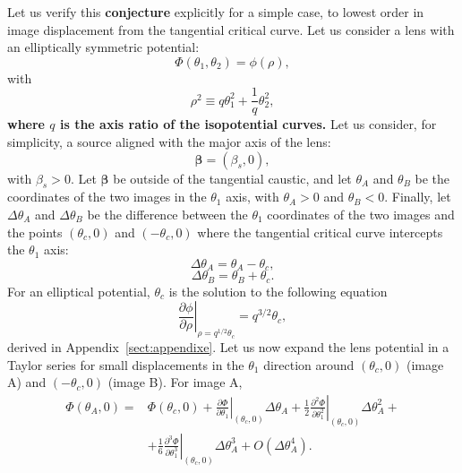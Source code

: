 \documentclass[usenatbib]{mnras}
\begin{document}
Let us verify this {\bf conjecture} explicitly for a simple case, to lowest order in image displacement from the tangential critical curve.
Let us consider a lens with an elliptically symmetric potential:
\begin{equation}\label{eq:potell}
\Phi(\theta_1, \theta_2) = \phi(\rho),
\end{equation} 
with
\begin{equation}
\rho^2 \equiv q\theta_1^2 + \frac1q\theta_2^2,
\end{equation}
{\bf where $q$ is the axis ratio of the isopotential curves.}
Let us consider, for simplicity, a source aligned with the major axis of the lens:
\begin{equation}
\boldsymbol\beta = (\beta_s, 0),
\end{equation}
with $\beta_s > 0$.
Let $\boldsymbol\beta$ be outside of the tangential caustic, and let $\theta_A$ and $\theta_B$ be the coordinates of the two images in the $\theta_1$ axis, with $\theta_A > 0$ and $\theta_B < 0$.
Finally, let $\Delta\theta_A$ and $\Delta\theta_B$ be the difference between the $\theta_1$ coordinates of the two images and the points $(\theta_c,0)$ and $(-\theta_c,0)$ where the tangential critical curve intercepts the $\theta_1$ axis:
\begin{equation}
\Delta\theta_A = \theta_A - \theta_c,
\end{equation}
\begin{equation}
\Delta\theta_B = \theta_B + \theta_c.
\end{equation}
For an elliptical potential, $\theta_c$ is the solution to the following equation
\begin{equation}\label{eq:critell}
\left.\frac{\partial\phi}{\partial\rho}\right\rvert_{\rho=q^{1/2}\theta_c} = q^{3/2}\theta_c,
\end{equation}
derived in Appendix~\ref{sect:appendixe}.
Let us now expand the lens potential in a Taylor series for small displacements in the $\theta_1$ direction around $(\theta_c, 0)$ (image A) and $(-\theta_c, 0)$ (image B).
For image A,
\begin{align}
\Phi(\theta_A, 0) = &\Phi(\theta_c, 0) + \left.\frac{\partial\Phi}{\partial\theta_1}\right\rvert_{(\theta_c,0)}\Delta\theta_A + \frac12\left.\frac{\partial^2\Phi}{\partial\theta_1^2}\right\rvert_{(\theta_c,0)}\Delta\theta_A^2 + \nonumber \\
& + \frac16\left.\frac{\partial^3\Phi}{\partial\theta_1^3}\right\rvert_{(\theta_c,0)}\Delta\theta_A^3 + O(\Delta\theta_A^4).
\end{align}
\end{document}
